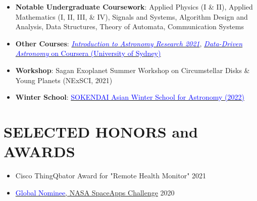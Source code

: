\documentclass[11pt]{res} %
\newcommand{\sectgap}{0.05in} %
\begin{document}
\begin{resume}
\vspace{0.25in}

\begin{itemize}
\item \textbf{Notable Undergraduate Coursework}: Applied Physics (I \& II), Applied Mathematics (I, II, III, \& IV), Signals and Systems, Algorithm Design and Analysis, Data Structures, Theory of Automata, Communication Systems
\item \textbf{Other Courses}: \href{https://github.com/howardisaacson/Intro-to-Astro-2021}{\textcolor{blue}{\textit{Introduction to Astronomy Research 2021}}}, \href{https://www.coursera.org/learn/data-driven-astronomy}{\textcolor{blue}{\textit{Data-Driven Astronomy} on Coursera (University of Sydney)}}

\item \textbf{Workshop}: Sagan Exoplanet Summer Workshop on Circumstellar Disks \& Young Planets (NExSCI, 2021) 

\item \textbf{Winter School}: \href{https://github.com/snowclipsed/certificates/blob/12a614579095a3409db9537db1938011ec9940c5/winter_school2022.pdf}{\textcolor{blue}{SOKENDAI Asian Winter School for Astronomy (2022)}}
\end{itemize}
\vspace{0.1in}
\hline
\section{SELECTED HONORS and AWARDS}

\vspace{0.2in} 

\begin{itemize}
    \item Cisco ThingQbator Award for "Remote Health Monitor" \hfill 2021
    \item \href{https://drive.google.com/file/d/17ZJo4-pI5jahQdTnzoRaii2Tmgww8yx6/view}{\textcolor{blue}{Global Nominee}, NASA SpaceApps Challenge} \hfill 2020

\end{itemize}

\vspace{\sectgap} 

\hline




\end{resume}
\end{document}
